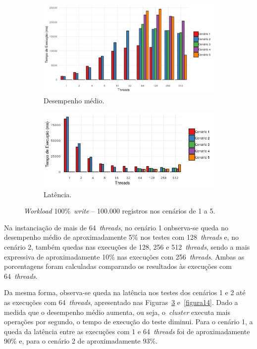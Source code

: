 \documentclass[12pt]{article}
\begin{document}
\begin{figure}
    \centering
    \begin{subfigure}[b]{0.49\textwidth}
        \centering
        \includegraphics[width=\textwidth]{images/figura11}
        \caption{Desempenho médio.}
        \label{figura11}
    \end{subfigure}
        \hfill
    \begin{subfigure}[b]{0.49\textwidth}  
        \centering 
        \includegraphics[width=\textwidth]{images/figura12}
        \caption{Latência.}%
        \label{figura12}
    \end{subfigure}
    \caption{\emph{Workload} 100\%~\emph{write} -- 100.000 registros nos cenários de 1 a 5.}
\end{figure}

Na instanciação de mais de 64~\emph{threads}, no cenário 1 onbserva-se queda no desempenho médio de aproximadamente 5\% nos testes com 128~\emph{threads} e, no cenário 2, também quedas nas execuções de 128, 256 e 512~\emph{threads}, sendo a mais expressiva de aproximadamente 10\% nas execuções com 256~\emph{threads}. Ambas as porcentagens foram calculadas comparando os resultados às execuções com 64~\emph{threads}.

Da mesma forma, observa-se queda na latência nos testes dos cenários 1 e 2 até as execuções com 64~\emph{threads}, apresentado nas Figuras~\ref{figura12} e~\ref{figura14}. 
Dado a medida que o desempenho médio aumenta, ou seja, o~\emph{cluster} executa mais operações por segundo, o tempo de execução do teste diminui. 
Para o cenário 1, a queda da latência entre as execuções com 1 e 64~\emph{threads} foi de aproximadamente 90\% e, para o cenário 2 de aproximadamente 93\%.
\end{document}
